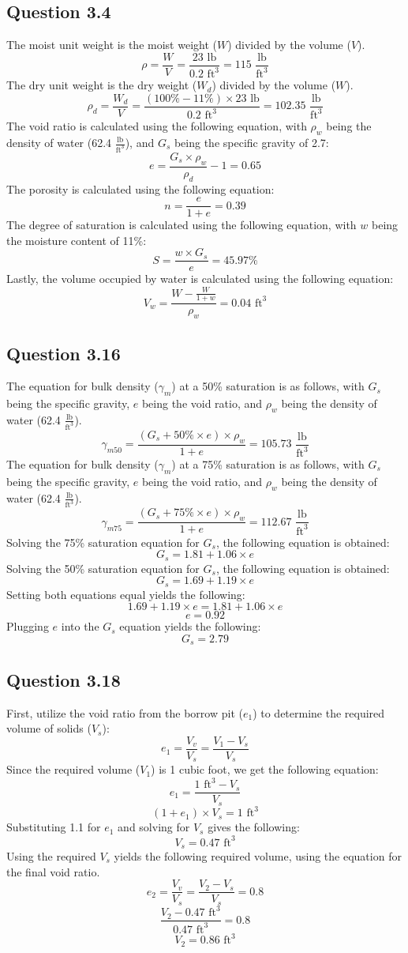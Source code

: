 \documentclass{article}
\begin{document}
\subsection*{Question 3.4}
The moist unit weight is the moist weight ($W$) divided by the volume ($V$).
\[\rho=\frac{W}{V}=\frac{23\text{ lb}}{0.2\text{ ft}^3}=\boxed{115\,\,\frac{\text{lb}}{\text{ft}^3}}\] 
The dry unit weight is the dry weight ($W_d$) divided by the volume ($W$).
\[\rho_d=\frac{W_d}{V}=\frac{(100\%-11\%)\times 23\text{ lb}}{0.2\text{ ft}^3}=\boxed{102.35\,\,\frac{\text{lb}}{\text{ft}^3}}\] 
The void ratio is calculated using the following equation, with $\rho_w$ being the density of water (62.4 $\frac{\text{lb}}{\text{ft}^3}$), and $G_s$ being the specific gravity of 2.7:
\[e=\frac{G_s\times\rho_w}{\rho_d}-1=\boxed{0.65}\]
The porosity is calculated using the following equation: 
\[n=\frac{e}{1+e}=\boxed{0.39}\]
The degree of saturation is calculated using the following equation, with $w$ being the moisture content of 11\%: 
\[S = \frac{w\times G_s}{e}=\boxed{45.97\%}\]
Lastly, the volume occupied by water is calculated using the following equation: 
\[V_w=\frac{W-\frac{W}{1+w}}{\rho_w}=\boxed{0.04 \text{ ft}^3}\]
\subsection*{Question 3.16}
The equation for bulk density ($\gamma_m$) at a 50\% saturation is as follows, with $G_s$ being the specific gravity, $e$ being the void ratio, and $\rho_w$ being the density of water (62.4 $\frac{\text{lb}}{\text{ft}^3}$). 
\[\gamma_{m50}=\frac{(G_s+50\%\times e)\times\rho_w}{1+e}=105.73 \,\,\frac{\text{lb}}{\text{ft}^3}\]
The equation for bulk density ($\gamma_m$) at a 75\% saturation is as follows, with $G_s$ being the specific gravity, $e$ being the void ratio, and $\rho_w$ being the density of water (62.4 $\frac{\text{lb}}{\text{ft}^3}$). 
\[\gamma_{m75}=\frac{(G_s+75\%\times e)\times\rho_w}{1+e}=112.67 \,\,\frac{\text{lb}}{\text{ft}^3}\]
Solving the 75\% saturation equation for $G_s$, the following equation is obtained: 
\[G_s=1.81+1.06\times e\] 
Solving the 50\% saturation equation for $G_s$, the following equation is obtained: 
\[G_s=1.69+1.19\times e\]
Setting both equations equal yields the following: 
\[1.69+1.19\times e = 1.81+1.06\times e\] 
\[e=\boxed{0.92}\] 
Plugging $e$ into the $G_s$ equation yields the following: 
\[G_s = \boxed{2.79}\]
\subsection*{Question 3.18}
First, utilize the void ratio from the borrow pit ($e_1$) to determine the required volume of solids ($V_s$): 
\[e_{1}=\frac{V_v}{V_s}=\frac{V_1-V_s}{V_s}\] 
Since the required volume ($V_1$) is 1 cubic foot, we get the following equation: 
\[e_1=\frac{1\text{ ft}^3-V_s}{V_s}\] 
\[(1+e_1)\times V_s=1\text{ ft}^3\] 
Substituting 1.1 for $e_1$ and solving for $V_s$ gives the following: 
\[V_s = 0.47\text{ ft}^3\] 
Using the required $V_s$ yields the following required volume, using the equation for the final void ratio. 
\[e_{2}=\frac{V_v}{V_s}=\frac{V_2-V_s}{V_s}=0.8\] 
\[\frac{V_2-0.47\text{ ft}^3}{0.47\text{ ft}^3}=0.8\] 
\[V_2=\boxed{0.86 \text{ ft}^3}\]
\end{document}
